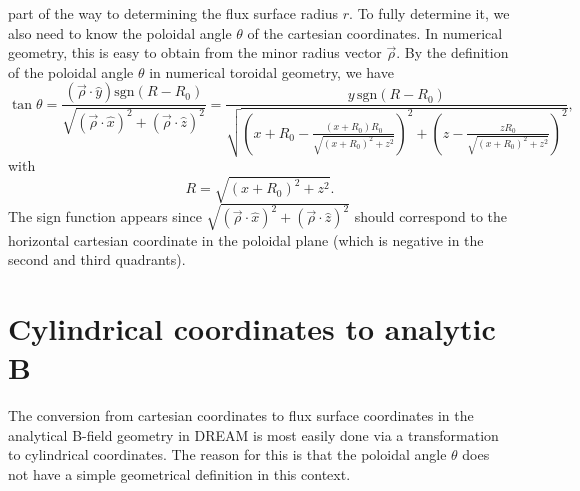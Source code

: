 \documentclass{notes}
\begin{document}
    part of the way to determining the flux surface radius $r$. To fully
    determine it, we also need to know the poloidal angle $\theta$ of the
    cartesian coordinates. In numerical geometry, this is easy to obtain from
    the minor radius vector $\vec{\rho}$. By the definition of the poloidal
    angle $\theta$ in numerical toroidal geometry, we have
    \begin{equation}
        \tan\theta = \frac{\left(\vec{\rho}\cdot\hat{y}\right)\mathrm{sgn}\left(R-R_0\right)}
            {\sqrt{\left(\vec{\rho}\cdot\hat{x}\right)^2 + \left(\vec{\rho}\cdot\hat{z}\right)^2}}
        = \frac{y\,\mathrm{sgn}\left(R-R_0\right)}{\sqrt{
            \left(x+R_0-\frac{(x+R_0)R_0}{\sqrt{\left(x+R_0\right)^2 + z^2}}\right)^2
            + \left(z-\frac{zR_0}{\sqrt{\left(x+R_0\right)^2 + z^2}}\right)^2
        }},
    \end{equation}
    with
    \begin{equation}
        R = \sqrt{(x+R_0)^2+z^2}.
    \end{equation}
    The sign function appears since
    $\sqrt{(\vec{\rho}\cdot\hat{x})^2 + (\vec{\rho}\cdot\hat{z})^2}$
    should correspond to the horizontal cartesian coordinate in the poloidal
    plane (which is negative in the second and third quadrants).
    
    \section{Cylindrical coordinates to analytic B}
    The conversion from cartesian coordinates to flux surface coordinates in the analytical B-field geometry in DREAM is most easily done via a transformation to cylindrical coordinates. The reason for this is that the poloidal angle $\theta$ does not have a simple geometrical definition in this context.
    
\end{document}
